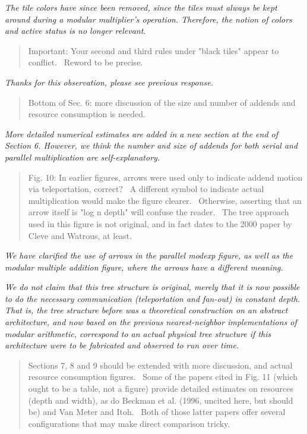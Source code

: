 \documentclass{article}
\theoremstyle{plain} \newtheorem{lemma}{Lemma}
\begin{document}
{\it The tile colors have since been removed, since the tiles must always be kept around
during a modular multiplier's operation. Therefore, the notion of colors and active status is
no longer relevant.}

\begin{quote}
Important: Your second and third rules under "black tiles" appear to
conflict.  Reword to be precise.
\end{quote}

{\it Thanks for this observation, please see previous response.}

\begin{quote}
Bottom of Sec. 6: more discussion of the size and number of addends
and resource consumption is needed.
\end{quote}

{\it More detailed numerical estimates are added in a new section at the end of
Section 6. However, we think the number and size of addends for both serial and parallel
multiplication are self-explanatory.}

\begin{quote}
Fig. 10: In earlier figures, arrows were used only to indicate addend
motion via teleportation, correct?  A different symbol to indicate
actual multiplication would make the figure clearer.  Otherwise,
asserting that an arrow itself is "log n depth" will confuse the
reader.  The tree approach used in this figure is not original, and in
fact dates to the 2000 paper by Cleve and Watrous, at least.
\end{quote}

{\it We have clarified the use of arrows in the parallel modexp figure, as well as the modular multiple addition figure, where the arrows have a different meaning.}

{\it We do not claim that this tree structure is original, merely that it is
now possible to do the necessary communication (teleportation and fan-out)
in constant depth. That is, the tree structure before was a theoretical
construction on an abstract architecture, and now based on the previous nearest-neighbor implementations
of modular arithmetic, correspond to an actual physical tree structure if
this architecture were to be fabricated and observed to run over time.}

\begin{quote}
Sections 7, 8 and 9 should be extended with more discussion, and
actual resource consumption figures.  Some of the papers cited in
Fig. 11 (which ought to be a table, not a figure) provide detailed
estimates on resources (depth and width), as do Beckman et al. (1996,
uncited here, but should be) and Van Meter and Itoh.  Both of those
latter papers offer several configurations that may make direct
comparison tricky.
\end{quote}
\end{document}
